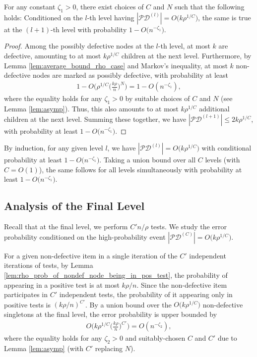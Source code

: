 \begin{lemma}
For any constant $\zeta_1>0$, there exist choices of $C$ and $N$ such that the following holds: Conditioned on the $l$-th level having $|\mathcal{PD}^{(l)}|=O\big(k\rho^{1/C}\big)$, the same is true at the $(l+1)$-th level with probability $1-O\big(n^{-\zeta_1}\big)$.
\end{lemma}

\begin{proof}
Among the possibly defective nodes at the $l$-th level, at most $k$ are defective, amounting to at most $k\rho^{1/C}$ children at the next level. Furthermore, by Lemma \ref{lem:average_bound_rho_case} and Markov's inequality, at most $k$ non-defective nodes are marked as possibly defective, with probability at least
\begin{align}
    1-O\bigg(\rho^{1/C}\Big(\frac{k\rho}{n}\Big)^{N}\bigg) = 1 - O(n^{-\zeta_1}), 
\end{align}
where the equality holds for any $\zeta_1 > 0$ by suitable choices of $C$ and $N$ (see Lemma \ref{lem:asymp}).
Thus, this also amounts to at most $k\rho^{1/C}$ additional children at the next level. Summing these together, we have $|\mathcal{PD}^{(l+1)}| \le 2 k\rho^{1/C}$, with probability at least $1-O\big(n^{-\zeta_1}\big)$.
\end{proof}

By induction, for any given level $l$, we have $|\mathcal{PD}^{(l)}|=O\big(k\rho^{1/C}\big)$ with conditional probability at least $1-O\big(n^{-\zeta_1}\big)$. Taking a union bound over all $C$ levels (with $C = O(1)$), the same follows for all levels simultaneously with probability at least $1-O\big(n^{-\zeta_1}\big)$.

\subsection{Analysis of the Final Level}

Recall that at the final level, we perform $C'n/\rho$ tests. We study the error probability conditioned on the high-probability event $|\mathcal{PD}^{(C)}|=O\big(k\rho^{1/C}\big)$.

For a given non-defective item in a single iteration of the $C'$ independent iterations of tests, by Lemma \ref{lem:rho_prob_of_nondef_node_being_in_pos_test}, the probability of appearing in a positive test is at most $k\rho/n$. Since the non-defective item participates in $C'$ independent tests, the probability of it appearing only in positive tests is $(k\rho/n)^{C'}$. By a union bound over the $O\big(k\rho^{1/C}\big)$ non-defective singletons at the final level, the error probability is upper bounded by
\begin{align}
    O\bigg(k\rho^{1/C}\Big(\frac{k\rho}{n}\Big)^{C'}\bigg) = O(n^{-\zeta_2}),
\end{align}
where the equality holds for any $\zeta_2 > 0$ and suitably-chosen $C$ and $C'$ due to Lemma \ref{lem:asymp} (with $C'$ replacing $N$).

